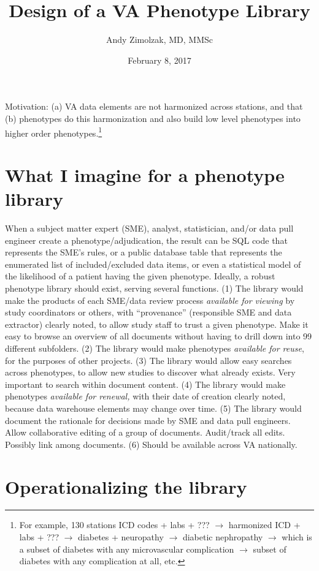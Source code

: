\documentclass{tufte-handout}
\title{Design of a VA Phenotype Library}
\author{Andy Zimolzak, MD, MMSc}
\date{February 8, 2017}
\begin{document}
\maketitle

Motivation: (a) VA data elements are not harmonized across stations,
and that (b) phenotypes do this harmonization and also build low level
phenotypes into higher order phenotypes.\footnote{For example, 130
  stations ICD codes + labs + ??? $\to$ harmonized ICD + labs + ???
  $\to$ diabetes + neuropathy $\to$ diabetic nephropathy $\to$ which
  is a subset of diabetes with any microvascular complication $\to$
  subset of diabetes with any complication at all, etc.}

\section{What I imagine for a phenotype library}

When a subject matter expert (SME), analyst, statistician, and/or data
pull engineer create a phenotype/adjudication, the result can be SQL
code that represents the SME's rules, or a public database table that
represents the enumerated list of included/excluded data items, or
even a statistical model of the likelihood of a patient having the
given phenotype. Ideally, a robust phenotype library should exist,
serving several functions. (1) The library would make the products of
each SME/data review process \emph{available for viewing} by study
coordinators or others, with ``provenance'' (responsible SME and data
extractor) clearly noted, to allow study staff to trust a given
phenotype. Make it easy to browse an overview of all documents
without having to drill down into 99 different subfolders. (2) The library would make phenotypes \emph{available for
  reuse}, for the purposes of other projects. (3) The library would
allow easy searches across phenotypes, to allow new studies to
discover what already exists. Very important
to search within document content. (4) The library would make phenotypes
\emph{available for renewal,} with their date of creation clearly
noted, because data warehouse elements may change over time. (5) The
library would document the rationale for decisions made by SME and
data pull engineers. Allow collaborative editing of a group of documents. Audit/track all edits. Possibly
link among documents.  
(6) Should be available across VA nationally.

\section{Operationalizing the library}
\end{document}
